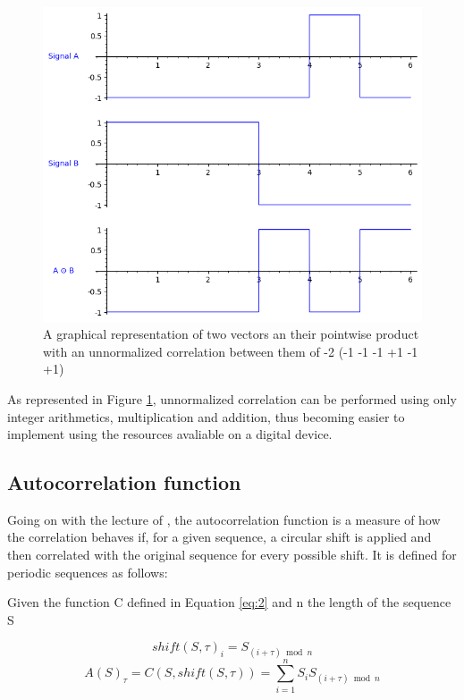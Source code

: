 \begin{figure}[ht!] %
\begin{center}
\includegraphics[width=0.7\linewidth]{Chapters/Introduction/signals_correlation}
\end{center}
\caption{A graphical representation of two vectors an their pointwise product
with an unnormalized correlation between them of -2 (-1 -1 -1 +1 -1 +1)}
\label{introduction_signals_hadamard}
\end{figure}

As represented in Figure \ref{introduction_signals_hadamard}, unnormalized
correlation can be performed using only integer arithmetics, multiplication
and addition, thus becoming easier to implement using the resources  avaliable
on a digital device.










\subsection{Autocorrelation function}

Going on with the lecture of \citet{golomb_ref}, the autocorrelation function
is a measure of how the correlation behaves if, for a given sequence, a
circular shift is applied and then correlated with the original sequence for every
possible shift. It is defined for periodic sequences as follows:

\begin{definition}[Autocorrelation]\label{def:3}

Given the function C defined in Equation \eqref{eq:2} and n the length of the
sequence S

\begin{equation}\label{eq:3}
  shift(S, \tau)_i = S_{(i+\tau) \bmod n}
\end{equation}
\begin{equation}\label{eq:4}
  A(S)_{\tau} = C(S, shift(S, \tau)) = \sum_{i=1}^{n}S_{i}S_{(i+\tau) \bmod n}
\end{equation}

\end{definition}

